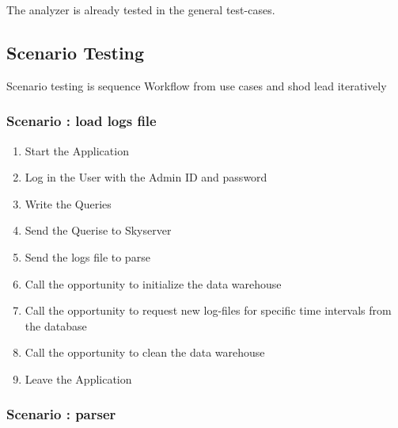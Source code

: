 The analyzer is already tested in the general test-cases.



\subsection{Scenario Testing}

Scenario testing is sequence Workflow from use cases and shod lead iteratively

\renewcommand{\theenumi}{/T\arabic{enumi}0/}
\renewcommand{\labelenumi}{\theenumi}

\subsubsection {Scenario : load logs file} 

\begin{enumerate}
 
\item Start the Application

\item Log in the User with the Admin ID and password

\item Write the Queries

\item Send the Querise to Skyserver

\item Send the logs file to parse

\item Call the opportunity to initialize the data warehouse

\item Call the opportunity to request new log-files for specific time intervals from the
database

\item Call the opportunity to clean the data warehouse %

\item Leave the Application

\end{enumerate}

\subsubsection {Scenario : parser} 

